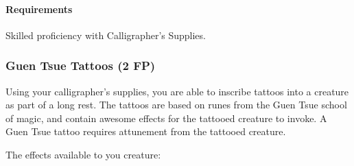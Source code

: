     \paragraph{Requirements} Skilled proficiency with Calligrapher's Supplies.
\subsubsection{Guen Tsue Tattoos (2 FP)} \label{feat::guentsuetattoos}
    Using your calligrapher's supplies, you are able to inscribe tattoos into a creature as part of a long rest.
    The tattoos are based on runes from the Guen Tsue school of magic, and contain awesome effects for the tattooed creature to invoke.
    A Guen Tsue tattoo requires attunement from the tattooed creature.

    The effects available to you creature:
